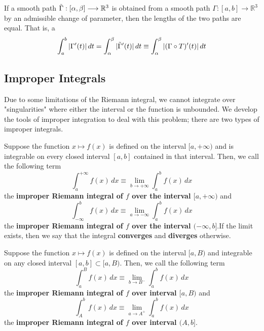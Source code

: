   \begin{theorem}
    If a smooth path $\Tilde{\Gamma}: [\alpha, \beta] \longrightarrow \mathbb{R}^3$ is obtained from a smooth path $\Gamma: [a, b] \longrightarrow \mathbb{R}^3$ by an admissible change of parameter, then the lengths of the two paths are equal. That is, a
    \begin{equation}
      \int_a^b |\Gamma^\prime (t) |\,dt = \int_\alpha^\beta |\Tilde{\Gamma}^\prime (t)|\,dt \equiv \int_\alpha^\beta |(\Gamma \circ T)^\prime (t)|\,dt
    \end{equation}
  \end{theorem}

\subsection{Improper Integrals}

  Due to some limitations of the Riemann integral, we cannot integrate over "singularities" where either the interval or the function is unbounded. We develop the tools of improper integration to deal with this problem; there are two types of improper integrals. 

  \begin{definition}
    Suppose the function $x \mapsto f(x)$ is defined on the interval $[a, +\infty)$ and is integrable on every closed interval $[a, b]$ contained in that interval. Then, we call the following term
    \[\int_a^{+\infty} f(x)\,dx \equiv \lim_{b \rightarrow + \infty} \int_a^b f(x)\,dx\]
    the \textbf{improper Riemann integral of $f$ over the interval $[a, +\infty)$} and 
    \[\int_{-\infty}^b f(x)\,dx \equiv \lim_{a \rightarrow -\infty} \int_a^b f(x)\,dx \]
    the \textbf{improper Riemann integral of $f$ over the interval $(-\infty, b]$}.If the limit exists, then we say that the integral \textbf{converges} and \textbf{diverges} otherwise. 
  \end{definition}

  \begin{definition}
    Suppose the function $x \mapsto f(x)$ is defined on the interval $[a, B)$ and integrable on any closed interval $[a, b] \subset [a, B)$. Then, we call the following term
    \[\int_a^B f(x)\,dx \equiv \lim_{b \rightarrow B^-} \int_a^b f(x)\,dx\]
    the \textbf{improper Riemann integral of $f$ over interval $[a, B)$} and
    \[\int_A^b f(x)\,dx \equiv \lim_{a \rightarrow A^+} \int_a^b f(x)\,dx\]
    the \textbf{improper Riemann integral of $f$ over interval $(A,b]$}.
  \end{definition}

